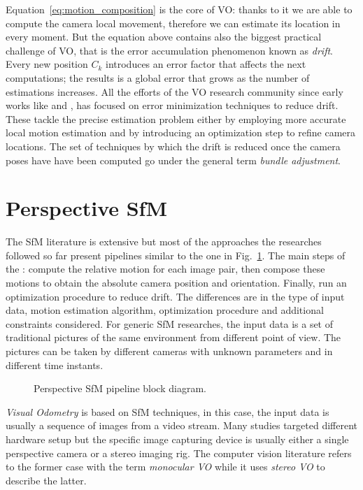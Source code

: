 Equation~\ref{eq:motion_composition} is the core of VO: thanks to it we are able
to compute the camera local movement, therefore we can estimate its location in 
every moment. But the equation above contains also the biggest practical 
challenge of VO, that is the error accumulation phenomenon known as 
\textit{drift}.
Every new position $C_k$ introduces an error factor that affects the next 
computations; the results is a global error that grows as the number of 
estimations increases.
All the efforts of the VO research community since early works like 
\cite{harris19883d} and \cite{moravec1980obstacle}, has focused on error
minimization techniques to reduce drift.
These tackle the precise estimation problem either by employing more accurate
local motion estimation and by introducing an optimization step to refine 
camera locations.
The set of techniques by which the drift is reduced once the camera poses have 
have been computed go under the general term \textit{bundle adjustment}.

\section{Perspective SfM}
The SfM literature is extensive but most of the approaches the 
researches followed so far present pipelines similar to the one in 
Fig.~\ref{fig:block_diagram}.
The main steps of the : compute the relative motion for each image
pair, then compose these motions to obtain the absolute camera position and 
orientation. Finally, run an optimization procedure to reduce drift.
The differences are in the type of input data, motion estimation algorithm,
optimization procedure and additional constraints considered.
For generic SfM researches, the input data is a set of traditional pictures of 
the same environment from different point of view. The pictures can be taken by 
different cameras with unknown parameters and in different time instants.
\begin{figure}
	\centering
	\def\svgwidth{0.5\columnwidth}
	
	\caption{Perspective SfM pipeline block diagram.}
	\label{fig:block_diagram}
\end{figure}
\textit{Visual Odometry} is based on SfM techniques, 
in this case, the input data is usually a sequence 
of images from a video stream. Many studies targeted different hardware setup 
but the specific image capturing device is usually either a single perspective 
camera or a stereo imaging rig. The computer vision literature refers to the
former case with the term \textit{monocular VO} while it uses \textit{stereo VO}
to describe the latter.

